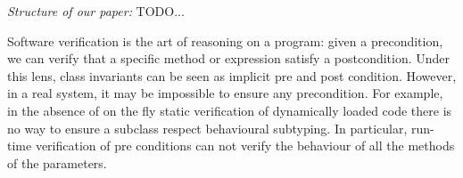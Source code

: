 

\noindent\textit{Structure of our paper:}
TODO...

\begin{comment}
 We now present how a real language could support
validation. 
We would like to underline that the
features we need have all been presented in the past, but their application to sound validation has never been explored.

In Section \ref{s:background} we will introduce one by one the various
language features cooperating
to support validation. %
We will provide a brief introduction to type modifiers, object capabilities, and exception safety.

In Sections \ref{s:validate}, \ref{s:immState}, and \ref{s:encapsulated}, we will show how TM and OC enable validation.
To clearly communicate what kind of checks the language semantics should perform,
 we will write them down as if they were `generated source code'.
However, our proposed approach is independent of the actual technique to insert these checks, and they may instead be inserted directly into bytecode, or they can be part of the underlying semantics of a virtual machine.

In Section \ref{s:meaning} we will provide formal definitions, and in Appendix \ref{s:proof} we provide  a proof that our language soundly enforces validation.
\end{comment}


\LINE



Software verification is the art of reasoning 
on a program: given a precondition, 
we can verify that a specific method or expression
satisfy a postcondition.
Under this lens, class invariants can be seen as implicit pre and post condition.
However, in a real system, it may be impossible to ensure any precondition. For example, 
in the absence of on the fly static verification of dynamically loaded code there is no way to ensure a
subclass respect behavioural subtyping.
In particular, run-time verification of pre conditions can not verify the behaviour of all the methods of the parameters.

